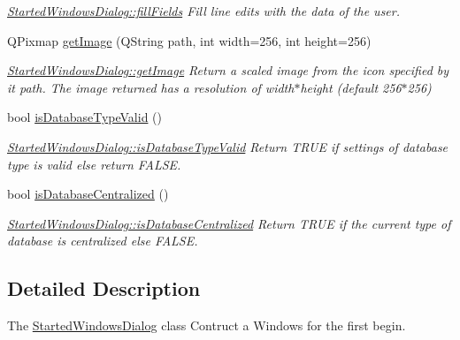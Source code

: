 \begin{DoxyCompactItemize}
\begin{DoxyCompactList}\small\item\em \hyperlink{classGui_1_1Dialogs_1_1StartedWindowsDialog_a30d97171779c86ecc497ef6990829fca}{Started\+Windows\+Dialog\+::fill\+Fields} Fill line edits with the data of the user. \end{DoxyCompactList}\item 
Q\+Pixmap \hyperlink{classGui_1_1Dialogs_1_1StartedWindowsDialog_ae3e9ade2f5949d5fb57e06c54106609f}{get\+Image} (Q\+String path, int width=256, int height=256)
\begin{DoxyCompactList}\small\item\em \hyperlink{classGui_1_1Dialogs_1_1StartedWindowsDialog_ae3e9ade2f5949d5fb57e06c54106609f}{Started\+Windows\+Dialog\+::get\+Image} Return a scaled image from the icon specified by it {\itshape path}. The image returned has a resolution of {\itshape width}$\ast${\itshape height} (default 256$\ast$256) \end{DoxyCompactList}\item 
bool \hyperlink{classGui_1_1Dialogs_1_1StartedWindowsDialog_ad582a62ec4204c2ef5081c5431824491}{is\+Database\+Type\+Valid} ()
\begin{DoxyCompactList}\small\item\em \hyperlink{classGui_1_1Dialogs_1_1StartedWindowsDialog_ad582a62ec4204c2ef5081c5431824491}{Started\+Windows\+Dialog\+::is\+Database\+Type\+Valid} Return T\+R\+U\+E if settings of database type is valid else return F\+A\+L\+S\+E. \end{DoxyCompactList}\item 
bool \hyperlink{classGui_1_1Dialogs_1_1StartedWindowsDialog_ac5127ad449080835c6f3bb572fb3e481}{is\+Database\+Centralized} ()
\begin{DoxyCompactList}\small\item\em \hyperlink{classGui_1_1Dialogs_1_1StartedWindowsDialog_ac5127ad449080835c6f3bb572fb3e481}{Started\+Windows\+Dialog\+::is\+Database\+Centralized} Return T\+R\+U\+E if the current type of database is centralized else F\+A\+L\+S\+E. \end{DoxyCompactList}\end{DoxyCompactItemize}


\subsection{Detailed Description}
The \hyperlink{classGui_1_1Dialogs_1_1StartedWindowsDialog}{Started\+Windows\+Dialog} class Contruct a Windows for the first begin. 

